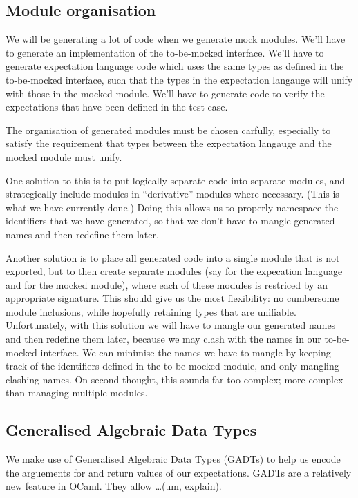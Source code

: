 \subsection{Module organisation}

We will be generating a lot of code when we generate mock
modules. We'll have to generate an implementation of the to-be-mocked
interface. We'll have to generate expectation language code which uses
the same types as defined in the to-be-mocked interface, such that
the types in the expectation langauge will unify with those in the
mocked module. We'll have to generate code to verify the expectations
that have been defined in the test case.

The organisation of generated modules must be chosen carfully,
especially to satisfy the requirement that types between the
expectation langauge and the mocked module must unify.

One solution to this is to put logically separate code into separate
modules, and strategically include modules in ``derivative'' modules
where necessary. (This is what we have currently done.) Doing this
allows us to properly namespace the identifiers that we have
generated, so that we don't have to mangle generated names and then
redefine them later.

Another solution is to place all generated code into a single module
that is not exported, but to then create separate modules (say
 for the expecation language and  for the mocked
module), where each of these modules is restriced by an appropriate
signature. This should give us the most flexibility: no cumbersome
module inclusions, while hopefully retaining types that are
unifiable. Unfortunately, with this solution we will have to mangle
our generated names and then redefine them later, because we may clash
with the names in our to-be-mocked interface. We can minimise the
names we have to mangle by keeping track of the identifiers defined in
the to-be-mocked module, and only mangling clashing names. On second
thought, this sounds far too complex; more complex than managing
multiple modules.

\subsection{Generalised Algebraic Data Types}
\label{application:gadt}

We make use of Generalised Algebraic Data Types (GADTs) to help us
encode the arguements for and return values of our expectations. GADTs
are a relatively new feature in OCaml. They allow \dots (um, explain).

